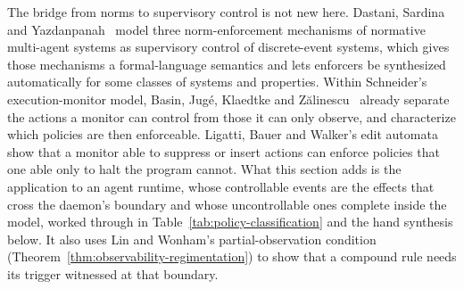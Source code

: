 \documentclass[11pt,a4paper]{article}
\theoremstyle{definition}
\theoremstyle{remark}
\begin{document}
The bridge from norms to supervisory control is not new here.
Dastani, Sardina and Yazdanpanah~ model three
norm-enforcement mechanisms of normative multi-agent systems as supervisory
control of discrete-event systems, which gives those mechanisms a
formal-language semantics and lets enforcers be synthesized automatically for
some classes of systems and properties. Within Schneider's execution-monitor
model, Basin, Jugé, Klaedtke and Zălinescu~ already
separate the actions a monitor can control from those it can only observe, and
characterize which policies are then enforceable. Ligatti, Bauer and Walker's
edit automata~ show that a monitor able to suppress or
insert actions can enforce policies that one able only to halt the program
cannot. What
this section adds is the
application to an agent runtime, whose controllable events are the effects that
cross the daemon's boundary and whose uncontrollable ones complete inside the
model, worked through in Table~\ref{tab:policy-classification} and the hand
synthesis below. It also uses Lin and Wonham's partial-observation condition
(Theorem~\ref{thm:observability-regimentation}) to show that a compound rule
needs its trigger witnessed at that boundary.
\end{document}
